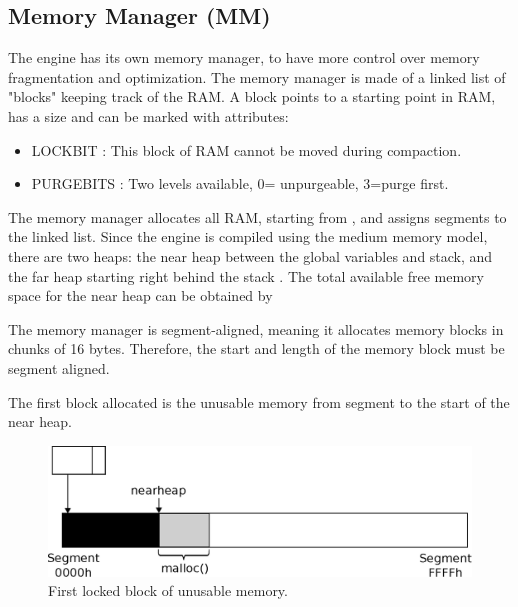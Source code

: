 \documentclass[book.tex]{subfiles}
\begin{document}
\subsection{Memory Manager (MM)}
The engine has its own memory manager, to have more control over memory fragmentation and optimization. The memory manager is made of a linked list of "blocks" keeping track of the RAM. A block points to a starting point in RAM, has a size and can be marked with attributes:
\begin{itemize}
  \item LOCKBIT : This block of RAM cannot be moved during compaction.
  \item PURGEBITS : Two levels available, 0= unpurgeable, 3=purge first.
\end{itemize}

\par

\par  
The memory manager allocates all RAM, starting from , and assigns segments to the linked list. Since the engine is compiled using the medium memory model, there are two heaps: the near heap between the global variables and stack, and the far heap starting right behind the stack . The total available free memory space for the near heap can be obtained by\\
\par


\par  
The memory manager is segment-aligned, meaning it allocates memory blocks in chunks of 16 bytes. Therefore, the start and length of the memory block must be segment aligned. \\




\par  
The first block allocated is the unusable memory from segment  to the start of the near heap.\\



\par  

\begin{figure}[H]
\centering
 \includegraphics[width=\textwidth]{imgs/drawings/mm_start.eps}
 \caption{First locked block of unusable memory.}
 \end{figure}
 \par
\end{document}
